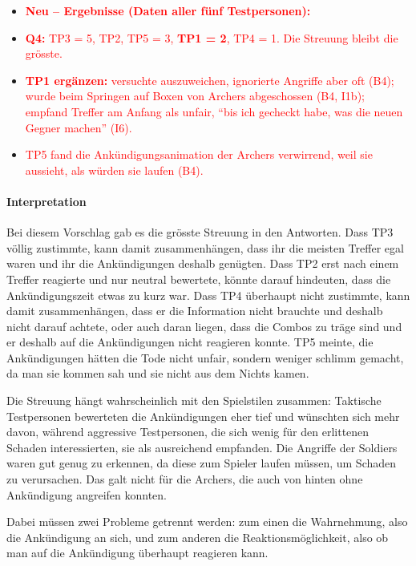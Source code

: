 \documentclass[../Main.tex]{subfiles}
\begin{document}
\begin{itemize}[leftmargin=1.5cm]
    \item \textcolor{red}{\textbf{Neu -- Ergebnisse (Daten aller fünf Testpersonen):}}
    \item \textcolor{red}{\textbf{Q4:} TP3 = 5, TP2, TP5 = 3, \textbf{TP1 = 2}, TP4 = 1. Die Streuung bleibt die grösste.}
    \item \textcolor{red}{\textbf{TP1 ergänzen:} versuchte auszuweichen, ignorierte Angriffe aber oft (B4); wurde beim Springen auf Boxen von Archers abgeschossen (B4, I1b); empfand Treffer am Anfang als unfair, \enquote{bis ich gecheckt habe, was die neuen Gegner machen} (I6).}
    \item \textcolor{red}{TP5 fand die Ankündigungsanimation der Archers verwirrend, weil sie aussieht, als würden sie laufen (B4).}
\end{itemize}

\paragraph{Interpretation}
Bei diesem Vorschlag gab es die grösste Streuung in den Antworten. Dass TP3 völlig zustimmte, kann damit zusammenhängen, dass ihr die meisten Treffer egal waren und ihr die Ankündigungen deshalb genügten. Dass TP2 erst nach einem Treffer reagierte und nur neutral bewertete, könnte darauf hindeuten, dass die Ankündigungszeit etwas zu kurz war. Dass TP4 überhaupt nicht zustimmte, kann damit zusammenhängen, dass er die Information nicht brauchte und deshalb nicht darauf achtete, oder auch daran liegen, dass die Combos zu träge sind und er deshalb auf die Ankündigungen nicht reagieren konnte. TP5 meinte, die Ankündigungen hätten die Tode nicht unfair, sondern weniger schlimm gemacht, da man sie kommen sah und sie nicht aus dem Nichts kamen.

Die Streuung hängt wahrscheinlich mit den Spielstilen zusammen: Taktische Testpersonen bewerteten die Ankündigungen eher tief und wünschten sich mehr davon, während aggressive Testpersonen, die sich wenig für den erlittenen Schaden interessierten, sie als ausreichend empfanden. Die Angriffe der Soldiers waren gut genug zu erkennen, da diese zum Spieler laufen müssen, um Schaden zu verursachen. Das galt nicht für die Archers, die auch von hinten ohne Ankündigung angreifen konnten.

Dabei müssen zwei Probleme getrennt werden: zum einen die Wahrnehmung, also die Ankündigung an sich, und zum anderen die Reaktionsmöglichkeit, also ob man auf die Ankündigung überhaupt reagieren kann.
\end{document}
